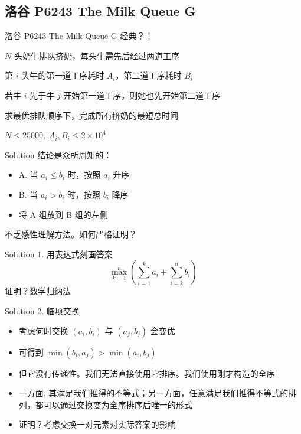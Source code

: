 ﻿\documentclass[aspectratio=169,handout]{ctexbeamer}
\begin{document}
\subsection{洛谷 P6243 The Milk Queue G}
\begin{frame}{洛谷 P6243 The Milk Queue G}
    经典？！

    $N$ 头奶牛排队挤奶，每头牛需先后经过两道工序

    第 $i$ 头牛的第一道工序耗时 $A_i$，第二道工序耗时 $B_i$

    若牛 $i$ 先于牛 $j$ 开始第一道工序，则她也先开始第二道工序

    求最优排队顺序下，完成所有挤奶的最短总时间

$N\leq 25000,\; A_i,B_i\leq 2\times 10^4$
\end{frame}

\begin{frame}{Solution}
    结论是众所周知的：
    \begin{itemize}
        \item A. 当 $a_i\le b_i$ 时，按照 $a_i$ 升序
        \item B. 当 $a_i> b_i$ 时，按照 $b_i$ 降序
        \item 将 A 组放到 B 组的左侧
    \end{itemize}
    不乏感性理解方法。如何严格证明？
\end{frame}

\begin{frame}{Solution}
    1. 用表达式刻画答案
    $$
        \max_{k=1}^n\left(\sum_{i=1}^k a_i+\sum_{i=k}^n b_i\right)
    $$
    证明？数学归纳法
\end{frame}

\begin{frame}{Solution}
    2. 临项交换
    
    \begin{itemize}
        \item 考虑何时交换 $(a_i,b_i)$ 与 $(a_j,b_j)$ 会变优
        
        \item 可得到 $\min(b_i,a_j)>\min(a_i,b_j)$
        \pause
        
        \item 但它没有传递性。我们无法直接使用它排序。我们使用刚才构造的全序
        \pause

        \item 一方面, 其满足我们推得的不等式；另一方面，任意满足我们推得不等式的排列，都可以通过交换变为全序排序后唯一的形式

        \item 证明？考虑交换一对元素对实际答案的影响
    \end{itemize}
\end{frame}
\end{document}
